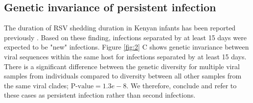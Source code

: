 \documentclass{article}
\begin{document}
\subsection{Genetic invariance of persistent infection}
The duration of RSV shedding duration in Kenyan infants has been reported previously
\cite{okiro2010duration}.
Based on these finding, infections separated by at least 15 days were expected to be "new" infections. 
Figure \ref{fig:2} C
shows genetic invariance between viral sequences within the same host for infections separated by at least 15 days. 
There is a significant difference between the genetic diversity for multiple viral samples from individuals compared to diversity between all other samples from the same viral clades; $\text{P-value} = 1.3e-8$.
We therefore, conclude and refer to these cases as persistent infection rather than second infections.
\end{document}
